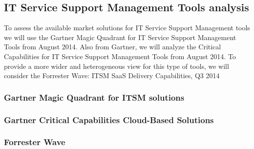 \subsection{IT Service Support Management Tools analysis}

To assess the available market solutions for IT Service Support Management tools we will use the Gartner Magic Quadrant for IT Service Support Management Tools from August 2014. Also from Gartner, we will analyze the Critical Capabilities for IT Service Support Management Tools from August 2014. To provide a more wider and heterogeneous view for this type of tools, we will consider the Forrester Wave: ITSM SaaS Delivery Capabilities, Q3 2014\par 

\subsubsection{Gartner Magic Quadrant for ITSM solutions}

\subsubsection{Gartner Critical Capabilities Cloud-Based Solutions}

\subsubsection{Forrester Wave}




